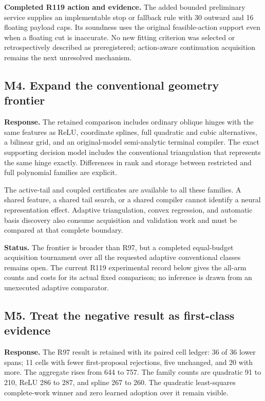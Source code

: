 \textbf{Completed R119 action and evidence.} The added bounded preliminary service supplies an implementable stop or fallback rule with 30 outward and 16 floating payload caps. Its soundness uses the original feasible-action support even when a floating cut is inaccurate. No new fitting criterion was selected or retrospectively described as preregistered; action-aware continuation acquisition remains the next unresolved mechanism.

\hypertarget{m4.-expand-the-conventional-geometry-frontier}{%
\subsection{M4. Expand the conventional geometry frontier}\label{m4.-expand-the-conventional-geometry-frontier}}

\textbf{Response.} The retained comparison includes ordinary oblique hinges with the same features as ReLU, coordinate splines, full quadratic and cubic alternatives, a bilinear grid, and an original-model semi-analytic terminal compiler. The exact supporting decision model includes the conventional triangulation that represents the same hinge exactly. Differences in rank and storage between restricted and full polynomial families are explicit.

The active-tail and coupled certificates are available to all these families. A shared feature, a shared tail search, or a shared compiler cannot identify a neural representation effect. Adaptive triangulation, convex regression, and automatic basis discovery also consume acquisition and validation work and must be compared at that complete boundary.

\textbf{Status.} The frontier is broader than R97, but a completed equal-budget acquisition tournament over all the requested adaptive conventional classes remains open. The current R119 experimental record below gives the all-arm counts and costs for its actual fixed comparison; no inference is drawn from an unexecuted adaptive comparator.

\hypertarget{m5.-treat-the-negative-result-as-first-class-evidence}{%
\subsection{M5. Treat the negative result as first-class evidence}\label{m5.-treat-the-negative-result-as-first-class-evidence}}

\textbf{Response.} The R97 result is retained with its paired cell ledger: 36 of 36 lower spans; 11 cells with fewer first-proposal rejections, five unchanged, and 20 with more. The aggregate rises from 644 to 757. The family counts are quadratic 91 to 210, ReLU 286 to 287, and spline 267 to 260. The quadratic least-squares complete-work winner and zero learned adoption over it remain visible.

